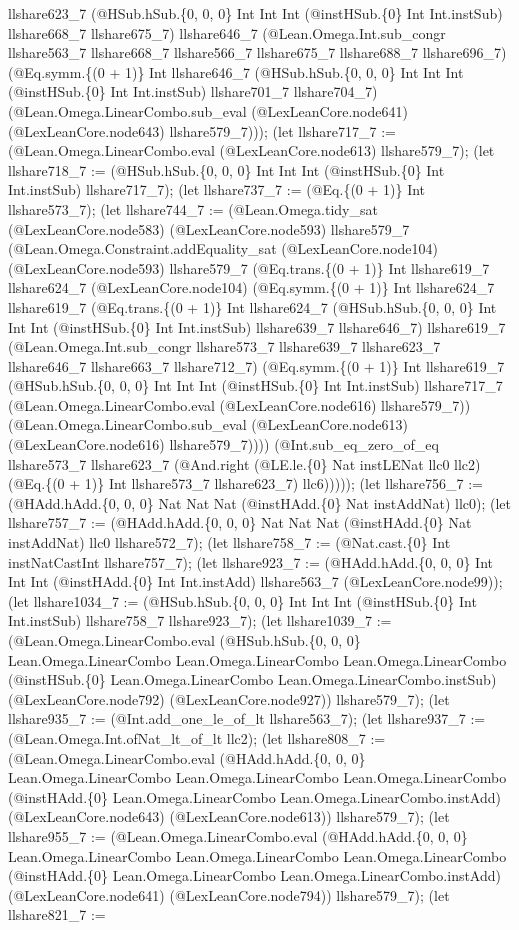 \documentclass[11pt]{article}
\begin{document}
llshare623\_7 (@HSub.hSub.\{0, 0, 0\} Int Int Int (@instHSub.\{0\} Int Int.instSub) llshare668\_7 llshare675\_7) llshare646\_7 (@Lean.Omega.Int.sub\_congr llshare563\_7 llshare668\_7 llshare566\_7 llshare675\_7 llshare688\_7 llshare696\_7) (@Eq.symm.\{(0 + 1)\} Int llshare646\_7 (@HSub.hSub.\{0, 0, 0\} Int Int Int (@instHSub.\{0\} Int Int.instSub) llshare701\_7 llshare704\_7) (@Lean.Omega.LinearCombo.sub\_eval (@LexLeanCore.node641) (@LexLeanCore.node643) llshare579\_7))); (let llshare717\_7 := (@Lean.Omega.LinearCombo.eval (@LexLeanCore.node613) llshare579\_7); (let llshare718\_7 := (@HSub.hSub.\{0, 0, 0\} Int Int Int (@instHSub.\{0\} Int Int.instSub) llshare717\_7); (let llshare737\_7 := (@Eq.\{(0 + 1)\} Int llshare573\_7); (let llshare744\_7 := (@Lean.Omega.tidy\_sat (@LexLeanCore.node583) (@LexLeanCore.node593) llshare579\_7 (@Lean.Omega.Constraint.addEquality\_sat (@LexLeanCore.node104) (@LexLeanCore.node593) llshare579\_7 (@Eq.trans.\{(0 + 1)\} Int llshare619\_7 llshare624\_7 (@LexLeanCore.node104) (@Eq.symm.\{(0 + 1)\} Int llshare624\_7 llshare619\_7 (@Eq.trans.\{(0 + 1)\} Int llshare624\_7 (@HSub.hSub.\{0, 0, 0\} Int Int Int (@instHSub.\{0\} Int Int.instSub) llshare639\_7 llshare646\_7) llshare619\_7 (@Lean.Omega.Int.sub\_congr llshare573\_7 llshare639\_7 llshare623\_7 llshare646\_7 llshare663\_7 llshare712\_7) (@Eq.symm.\{(0 + 1)\} Int llshare619\_7 (@HSub.hSub.\{0, 0, 0\} Int Int Int (@instHSub.\{0\} Int Int.instSub) llshare717\_7 (@Lean.Omega.LinearCombo.eval (@LexLeanCore.node616) llshare579\_7)) (@Lean.Omega.LinearCombo.sub\_eval (@LexLeanCore.node613) (@LexLeanCore.node616) llshare579\_7)))) (@Int.sub\_eq\_zero\_of\_eq llshare573\_7 llshare623\_7 (@And.right (@LE.le.\{0\} Nat instLENat llc0 llc2) (@Eq.\{(0 + 1)\} Int llshare573\_7 llshare623\_7) llc6))))); (let llshare756\_7 := (@HAdd.hAdd.\{0, 0, 0\} Nat Nat Nat (@instHAdd.\{0\} Nat instAddNat) llc0); (let llshare757\_7 := (@HAdd.hAdd.\{0, 0, 0\} Nat Nat Nat (@instHAdd.\{0\} Nat instAddNat) llc0 llshare572\_7); (let llshare758\_7 := (@Nat.cast.\{0\} Int instNatCastInt llshare757\_7); (let llshare923\_7 := (@HAdd.hAdd.\{0, 0, 0\} Int Int Int (@instHAdd.\{0\} Int Int.instAdd) llshare563\_7 (@LexLeanCore.node99)); (let llshare1034\_7 := (@HSub.hSub.\{0, 0, 0\} Int Int Int (@instHSub.\{0\} Int Int.instSub) llshare758\_7 llshare923\_7); (let llshare1039\_7 := (@Lean.Omega.LinearCombo.eval (@HSub.hSub.\{0, 0, 0\} Lean.Omega.LinearCombo Lean.Omega.LinearCombo Lean.Omega.LinearCombo (@instHSub.\{0\} Lean.Omega.LinearCombo Lean.Omega.LinearCombo.instSub) (@LexLeanCore.node792) (@LexLeanCore.node927)) llshare579\_7); (let llshare935\_7 := (@Int.add\_one\_le\_of\_lt llshare563\_7); (let llshare937\_7 := (@Lean.Omega.Int.ofNat\_lt\_of\_lt llc2); (let llshare808\_7 := (@Lean.Omega.LinearCombo.eval (@HAdd.hAdd.\{0, 0, 0\} Lean.Omega.LinearCombo Lean.Omega.LinearCombo Lean.Omega.LinearCombo (@instHAdd.\{0\} Lean.Omega.LinearCombo Lean.Omega.LinearCombo.instAdd) (@LexLeanCore.node643) (@LexLeanCore.node613)) llshare579\_7); (let llshare955\_7 := (@Lean.Omega.LinearCombo.eval (@HAdd.hAdd.\{0, 0, 0\} Lean.Omega.LinearCombo Lean.Omega.LinearCombo Lean.Omega.LinearCombo (@instHAdd.\{0\} Lean.Omega.LinearCombo Lean.Omega.LinearCombo.instAdd) (@LexLeanCore.node641) (@LexLeanCore.node794)) llshare579\_7); (let llshare821\_7 := 
\end{document}
